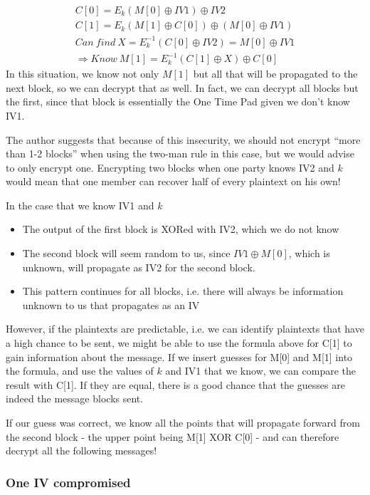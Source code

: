 \documentclass[conference]{IEEEtran}
\begin{document}
\begin{gather*}
  C[0] = E_k(M[0] \oplus IV1) \oplus IV2 \\
  C[1] = E_k(M[1] \oplus C[0]) \oplus (M[0] \oplus IV1) \\
  Can\ find\ X = E_k^{-1}(C[0] \oplus IV2) = M[0] \oplus IV1 \\
  \Rightarrow Know\ M[1] = E_k^{-1}(C[1] \oplus X) \oplus C[0]
\end{gather*}
In this situation, we know not only $M[1]$ but all that will be propagated to the next block, so we can decrypt that as well. In fact, we can decrypt all blocks but the first, since that block is essentially the One Time Pad given we don't know IV1.

The author suggests that because of this insecurity, we should not encrypt ``more than 1-2 blocks'' when using the two-man rule in this case, but we would advise to only encrypt one. Encrypting two blocks when one party knows IV2 and $k$ would mean that one member can recover half of every plaintext on his own!

In the case that we know IV1 and $k$
\begin{itemize}
 \item The output of the first block is XORed with IV2, which we do not know
 \item The second block will seem random to us, since $IV1 \oplus M[0]$, which is unknown, will propagate as IV2 for the second block.
 \item This pattern continues for all blocks, i.e. there will always be information unknown to us that propagates as an IV
\end{itemize}

However, if the plaintexts are predictable, i.e. we can identify plaintexts that have a high chance to be sent, we might be able to use the formula above for C[1] to gain information about the message. If we insert guesses for M[0] and M[1] into the formula, and use the values of $k$ and IV1 that we know, we can compare the result with C[1]. If they are equal, there is a good chance that the guesses are indeed the message blocks sent.

If our guess was correct, we know all the points that will propagate forward from the second block - the upper point being M[1] XOR C[0] - and can therefore decrypt all the following messages!

\subsubsection{One IV compromised} \
\end{document}
